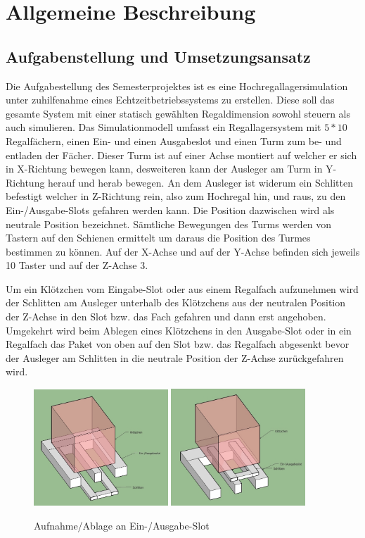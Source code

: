 \section{Allgemeine Beschreibung}
\subsection{Aufgabenstellung und Umsetzungsansatz}
Die Aufgabestellung des Semesterprojektes ist es eine Hochregallagersimulation unter zuhilfenahme eines Echtzeitbetriebssystems zu erstellen. Diese soll das gesamte System mit einer statisch gewählten Regaldimension sowohl steuern als auch simulieren.
Das Simulationmodell umfasst ein Regallagersystem mit $5*10$ Regalfächern, einen Ein- und einen Ausgabeslot und einen Turm zum be- und entladen der Fächer. Dieser Turm ist auf einer Achse montiert auf welcher er sich in X-Richtung bewegen kann, desweiteren kann der Ausleger am Turm in Y-Richtung herauf und herab bewegen. An dem Ausleger ist widerum ein Schlitten befestigt welcher in Z-Richtung rein, also zum Hochregal hin, und raus, zu den Ein-/Ausgabe-Slots gefahren werden kann. Die Position dazwischen wird als neutrale Position bezeichnet. Sämtliche Bewegungen des Turms werden von Tastern auf den Schienen ermittelt um daraus die Position des Turmes bestimmen zu können. Auf der X-Achse und auf der Y-Achse befinden sich jeweils 10 Taster und auf der Z-Achse 3.

Um ein Klötzchen vom Eingabe-Slot oder aus einem Regalfach aufzunehmen wird der Schlitten am Ausleger unterhalb des Klötzchens aus der neutralen Position der Z-Achse in den Slot bzw. das Fach gefahren und dann erst angehoben. Umgekehrt wird beim Ablegen eines Klötzchens in den Ausgabe-Slot oder in ein Regalfach das Paket von oben auf den Slot bzw. das Regalfach abgesenkt bevor der Ausleger am Schlitten  in die neutrale Position der Z-Achse zurückgefahren wird.
\begin{figure}[H]
	\centering
  \includegraphics[width=0.45\textwidth]{diagrams/vonunten.jpg}
  \includegraphics[width=0.45\textwidth]{diagrams/auflegernachoben.jpg}
	\caption{Aufnahme/Ablage an Ein-/Ausgabe-Slot}
	\label{fig2}
\end{figure}

